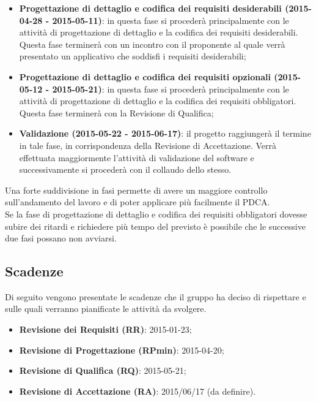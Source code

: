 \begin{itemize}
			\item \textbf{Progettazione di dettaglio e codifica dei requisiti desiderabili (2015-04-28 - 2015-05-11)}: in questa fase si procederà principalmente con le attività di progettazione di dettaglio e la codifica dei requisiti desiderabili. Questa fase terminerà con un incontro con il proponente al quale verrà presentato un applicativo che soddisfi i requisiti desiderabili;
			
			\item \textbf{Progettazione di dettaglio e codifica dei requisiti opzionali (2015-05-12 - 2015-05-21)}: in questa fase si procederà principalmente con le attività di progettazione di dettaglio e la codifica dei requisiti obbligatori. Questa fase terminerà con la Revisione di Qualifica;
			
			\item \textbf{Validazione (2015-05-22 - 2015-06-17)}: il progetto raggiungerà il termine in tale fase, in corrispondenza della Revisione di Accettazione. Verrà effettuata maggiormente l’attività di validazione del software e successivamente si procederà con il collaudo dello stesso.
		\end{itemize}
\noindent
	Una forte suddivisione in fasi permette di avere un maggiore controllo sull'andamento del lavoro e di poter applicare più facilmente il PDCA. \\
	Se la fase di progettazione di dettaglio e codifica dei requisiti obbligatori dovesse subire dei ritardi e richiedere più tempo del previsto è possibile che le successive due fasi possano non avviarsi.

	\subsection{Scadenze}
	Di seguito vengono presentate le scadenze che il gruppo \groupName{} ha deciso di rispettare e sulle quali verranno pianificate le attività da svolgere.
		\begin{itemize}
			\item \textbf{Revisione dei Requisiti (RR)}: 2015-01-23;
			\item \textbf{Revisione di Progettazione (RPmin)}: 2015-04-20;
			\item \textbf{Revisione di Qualifica (RQ)}: 2015-05-21;
			\item \textbf{Revisione di Accettazione (RA)}: 2015/06/17 (da definire).
		\end{itemize}
